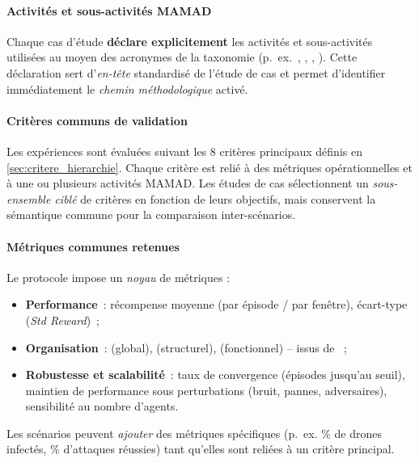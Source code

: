 \paragraph{Activités et sous-activités MAMAD}
Chaque cas d’étude \textbf{déclare explicitement} les activités et sous-activités utilisées au moyen des acronymes de la taxonomie (p.~ex.~, , , ). Cette déclaration sert d’\textit{en-tête} standardisé de l’étude de cas et permet d’identifier immédiatement le \textit{chemin méthodologique} activé.

\paragraph{Critères communs de validation}
Les expériences sont évaluées suivant les 8 critères principaux définis en \autoref{sec:critere_hierarchie}. Chaque critère est relié à des métriques opérationnelles et à une ou plusieurs activités MAMAD. Les études de cas sélectionnent un \textit{sous-ensemble ciblé} de critères en fonction de leurs objectifs, mais conservent la sémantique commune pour la comparaison inter-scénarios.

\paragraph{Métriques communes retenues}
Le protocole impose un \textit{noyau} de métriques :
\begin{itemize}
  \item \textbf{Performance}~: récompense moyenne (par épisode / par fenêtre), écart-type (\emph{Std Reward})~;
  \item \textbf{Organisation}~:  (global),  (structurel),  (fonctionnel) -- issus de ~;
  \item \textbf{Robustesse et scalabilité}~: taux de convergence (épisodes jusqu’au seuil), maintien de performance sous perturbations (bruit, pannes, adversaires), sensibilité au nombre d’agents.
\end{itemize}
Les scénarios peuvent \textit{ajouter} des métriques spécifiques (p.~ex. \% de drones infectés, \% d’attaques réussies) tant qu’elles sont reliées à un critère principal.


